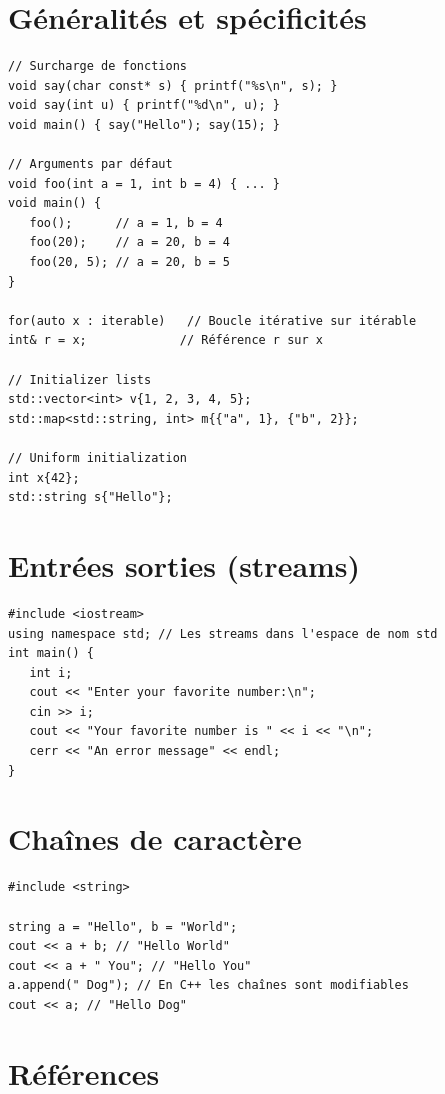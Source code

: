 \documentclass{article}
\begin{document}
\begin{multicols*}{3}
    \section*{Généralités et spécificités}

    \begin{lstlisting}
// Surcharge de fonctions
void say(char const* s) { printf("%s\n", s); }
void say(int u) { printf("%d\n", u); }
void main() { say("Hello"); say(15); }

// Arguments par défaut
void foo(int a = 1, int b = 4) { ... }
void main() {
   foo();      // a = 1, b = 4
   foo(20);    // a = 20, b = 4
   foo(20, 5); // a = 20, b = 5
}

for(auto x : iterable)   // Boucle itérative sur itérable
int& r = x;             // Référence r sur x

// Initializer lists
std::vector<int> v{1, 2, 3, 4, 5};
std::map<std::string, int> m{{"a", 1}, {"b", 2}};

// Uniform initialization
int x{42};
std::string s{"Hello"};
\end{lstlisting}

    \section*{Entrées sorties (streams)}

    \begin{lstlisting}
#include <iostream>
using namespace std; // Les streams dans l'espace de nom std
int main() {
   int i;
   cout << "Enter your favorite number:\n";
   cin >> i;
   cout << "Your favorite number is " << i << "\n";
   cerr << "An error message" << endl;
}
\end{lstlisting}

    \section*{Chaînes de caractère}

    \begin{lstlisting}
#include <string>

string a = "Hello", b = "World";
cout << a + b; // "Hello World"
cout << a + " You"; // "Hello You"
a.append(" Dog"); // En C++ les chaînes sont modifiables
cout << a; // "Hello Dog"
\end{lstlisting}

    \section*{Références}


\end{multicols*}
\end{document}

